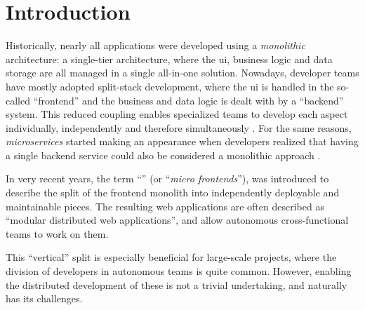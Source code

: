 
\chapter{Introduction}
\label{ch:introduction}




Historically, nearly all applications were developed using a
\textit{\gls{monolithic}} architecture: a single-tier architecture, where the
\gls{ui}, business logic and data storage are all managed in a single all-in-one
solution. Nowadays, developer teams have mostly adopted split-stack development,
where the \gls{ui} is handled in the so-called ``\gls{frontend}'' and the
business and data logic is dealt with by a ``\gls{backend}'' system. This
reduced coupling enables specialized teams to develop each aspect individually,
independently and therefore simultaneously \autocite{Dunkley_2016}. For the same
reasons, \textit{microservices} started making an appearance when developers
realized that having a single \gls{backend} service could also be considered a
\gls{monolithic} approach \autocite{Fowler_Microservices_2014}.

In very recent years, the term ``\textit{}'' (or
``\textit{micro frontends}''), was introduced to describe the split of the
\gls{frontend} \gls{monolith} into independently deployable and maintainable pieces.
The resulting web applications are often described as ``modular distributed web
applications'', and allow autonomous cross-functional teams to work on them.

This ``vertical'' split is especially beneficial for large-scale projects, where
the division of developers in autonomous teams is quite common. However,
enabling the distributed development of these  is not a
trivial undertaking, and naturally has its challenges.

